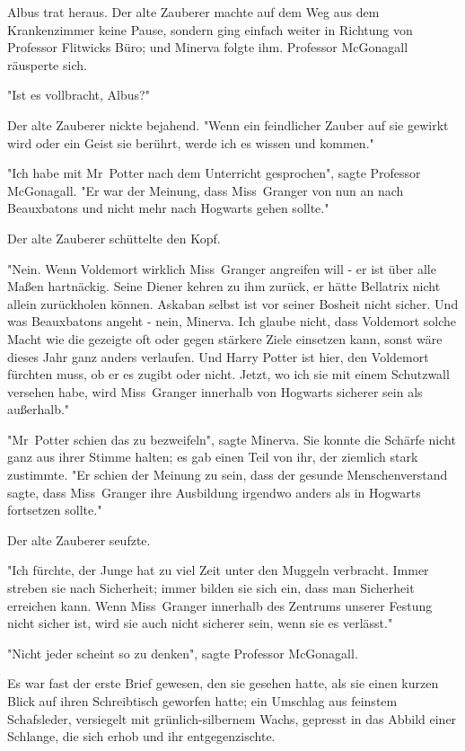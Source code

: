{Albus trat heraus. Der alte Zauberer machte auf dem Weg aus dem Krankenzimmer keine Pause, sondern ging einfach weiter in Richtung von Professor Flitwicks Büro; und Minerva folgte ihm. Professor McGonagall räusperte sich.

"Ist es vollbracht, Albus?"

Der alte Zauberer nickte bejahend. "Wenn ein feindlicher Zauber auf sie gewirkt wird oder ein Geist sie berührt, werde ich es wissen und kommen."

"Ich habe mit Mr~Potter nach dem Unterricht gesprochen", sagte Professor McGonagall. "Er war der Meinung, dass Miss~Granger von nun an nach Beauxbatons und nicht mehr nach Hogwarts gehen sollte."

Der alte Zauberer schüttelte den Kopf.

"Nein. Wenn Voldemort wirklich Miss~Granger angreifen will - er ist über alle Maßen hartnäckig. Seine Diener kehren zu ihm zurück, er hätte Bellatrix nicht allein zurückholen können. Askaban selbst ist vor seiner Bosheit nicht sicher. Und was Beauxbatons angeht - nein, Minerva. Ich glaube nicht, dass Voldemort solche Macht wie die gezeigte oft oder gegen stärkere Ziele einsetzen kann, sonst wäre dieses Jahr ganz anders verlaufen. Und Harry Potter ist hier, den Voldemort fürchten muss, ob er es zugibt oder nicht. Jetzt, wo ich sie mit einem Schutzwall versehen habe, wird Miss~Granger innerhalb von Hogwarts sicherer sein als außerhalb."

"Mr~Potter schien das zu bezweifeln", sagte Minerva. Sie konnte die Schärfe nicht ganz aus ihrer Stimme halten; es gab einen Teil von ihr, der ziemlich stark zustimmte. "Er schien der Meinung zu sein, dass der gesunde Menschenverstand sagte, dass Miss~Granger ihre Ausbildung irgendwo anders als in Hogwarts fortsetzen sollte."

Der alte Zauberer seufzte.

"Ich fürchte, der Junge hat zu viel Zeit unter den Muggeln verbracht. Immer streben sie nach Sicherheit; immer bilden sie sich ein, dass man Sicherheit erreichen kann. Wenn Miss~Granger innerhalb des Zentrums unserer Festung nicht sicher ist, wird sie auch nicht sicherer sein, wenn sie es verlässt."

"Nicht jeder scheint so zu denken", sagte Professor McGonagall.

Es war fast der erste Brief gewesen, den sie gesehen hatte, als sie einen kurzen Blick auf ihren Schreibtisch geworfen hatte; ein Umschlag aus feinstem Schafsleder, versiegelt mit grünlich-silbernem Wachs, gepresst in das Abbild einer Schlange, die sich erhob und ihr entgegenzischte.

}
